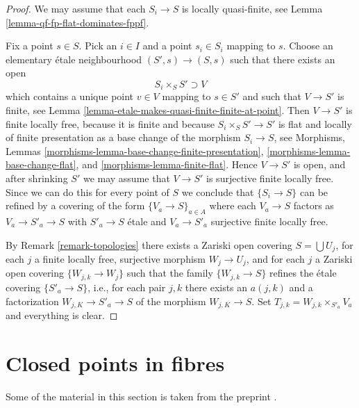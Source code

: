 \begin{proof}
We may assume that each $S_i \to S$ is locally quasi-finite, see
Lemma \ref{lemma-qf-fp-flat-dominates-fppf}.

\medskip\noindent
Fix a point $s \in S$. Pick an $i \in I$ and a point
$s_i \in S_i$ mapping to $s$. Choose an elementary \'etale neighbourhood
$(S', s) \to (S, s)$ such that there exists an open
$$
S_i \times_S S'  \supset V
$$
which contains a unique point $v \in V$ mapping to $s \in S'$
and such that $V \to S'$ is finite, see
Lemma \ref{lemma-etale-makes-quasi-finite-finite-at-point}.
Then $V \to S'$ is finite locally free, because it is finite
and because $S_i \times_S S' \to S'$ is flat and locally of finite presentation
as a base change of the morphism $S_i \to S$, see
Morphisms, Lemmas \ref{morphisms-lemma-base-change-finite-presentation},
\ref{morphisms-lemma-base-change-flat}, and
\ref{morphisms-lemma-finite-flat}.
Hence $V \to S'$ is open, and after shrinking $S'$
we may assume that $V \to S'$ is surjective finite locally free.
Since we can do this for every point of $S$ we conclude that
$\{S_i \to S\}$ can be refined by a covering of the form
$\{V_a \to S\}_{a \in A}$ where each $V_a \to S$ factors as
$V_a \to S'_a \to S$ with $S'_a \to S$ \'etale and $V_a \to S'_a$ surjective
finite locally free.

\medskip\noindent
By
Remark \ref{remark-topologies}
there exists a Zariski open covering $S = \bigcup U_j$,
for each $j$ a finite locally free, surjective morphism
$W_j \to U_j$, and for each $j$ a Zariski open covering
$\{W_{j, k} \to W_j\}$ such that the family
$\{W_{j, k} \to S\}$ refines the \'etale covering
$\{S'_a \to S\}$, i.e., for each pair $j, k$ there exists
an $a(j, k)$ and a factorization $W_{j, K} \to S'_a \to S$
of the morphism $W_{j, K} \to S$. Set
$T_{j, k} = W_{j, k} \times_{S'_a} V_a$ and everything is clear.
\end{proof}








\section{Closed points in fibres}
\label{section-closed-points-fibres}

\noindent
Some of the material in this section is taken from the preprint
\cite{Osserman-Payne}.

